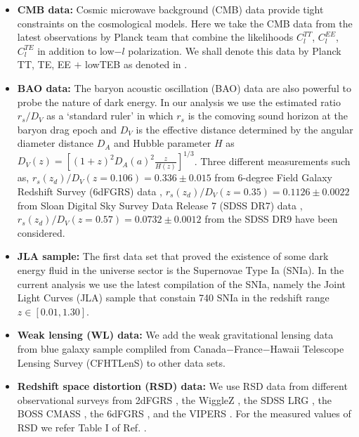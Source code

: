 \documentclass[superscriptaddress,oneolumn,secnumarabic,
amssymb,amsmath,nobibnotes,aps,prd,showpacs,nofootinbib]{revtex4}%
\begin{document}
\begin{itemize}

\item \textbf{CMB data:} Cosmic microwave background (CMB) data provide tight constraints on the cosmological models. Here we take the CMB data from the latest observations by Planck team
\cite{ref:Planck2015-1, ref:Planck2015-2} that combine the likelihoods $C^{TT}_l$, $C^{EE}_l$, $C^{TE}_l$ in addition to low$-l$ polarization. We shall denote this data by Planck TT,
TE, EE $+$ lowTEB as denoted in \cite{Ade:2015xua}.\newline

\item \textbf{BAO data:} The baryon acoustic oscillation (BAO) data are also powerful to probe the nature of dark energy.  In our analysis we use the estimated ratio $r_s/D_V$ as a `standard ruler' in which $r_s$ is the comoving sound horizon at the baryon drag epoch and $D_V$ is the effective distance determined by the angular diameter distance $D_A$ and Hubble parameter $H$ as $D_V(z)=\left[(1+z)^2D_A(a)^2\frac{z}{H(z)}\right]^{1/3}$. Three different measurements such as, $r_s(z_d)/D_V(z=0.106)=0.336\pm0.015$ from 6-degree Field Galaxy Redshift Survey (6dFGRS) data \cite{Beutler:2011hx}, $r_s(z_d)/D_V(z=0.35)=0.1126\pm0.0022$ from Sloan Digital
Sky Survey Data Release 7 (SDSS DR7) data \cite{Padmanabhan:2012hf}, $r_s(z_d)/D_V(z=0.57)=0.0732\pm0.0012$ from the SDSS DR9 \cite{Manera:2012sc} have been considered.\newline

\item \textbf{JLA sample:} The first data set that proved the existence of some dark energy fluid in the universe sector is the Supernovae Type Ia (SNIa). In the current analysis we use the latest compilation of the SNIa, namely the Joint Light Curves (JLA) sample \cite{Betoule:2014frx} that constain 740 SNIa in the redshift range $z\in[0.01, 1.30]$.\newline

\item \textbf{Weak lensing (WL) data:} We add the weak gravitational lensing
data from blue galaxy sample compliled from  Canada$-$France$-$Hawaii Telescope Lensing Survey
(CFHTLenS) \cite{Heymans:2013fya,Asgari:2016xuw} to other data sets.\newline

\item \textbf{Redshift space distortion (RSD) data:} We use RSD data from different observational surveys
from 2dFGRS \cite{Percival:2004fs}, the WiggleZ \cite{Blake:2011rj}, the SDSS LRG \cite{Samushia:2011cs}, the BOSS CMASS \cite{Reid:2012sw}, the 6dFGRS \cite{Beutler:2012px}, and the VIPERS \cite{delaTorre:2013rpa}. For the measured values of RSD we refer Table I of Ref. \cite{Yang:2014hea}.\newline


\end{itemize}
\end{document}
